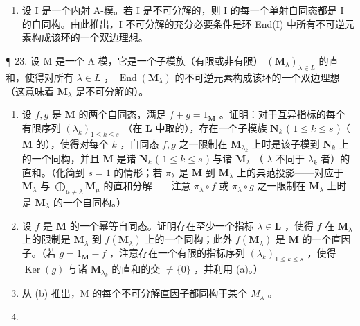 \begin{enumerate}
\def\labelenumi{\arabic{enumi}.}
\setcounter{enumi}{21}
\tightlist
\item
  设 I 是一个内射 A-模。若 I 是不可分解的，则 I 的每一个单射自同态都是 I 的自同构。由此推出，I 不可分解的充分必要条件是环 End(I) 中所有不可逆元素构成该环的一个双边理想。
\end{enumerate}

¶ 23. 设 M 是一个 A-模，它是一个子模族（有限或非有限） \((\mathbf{M}_{\lambda})_{\lambda \in L}\) 的直和，使得对所有 \(\lambda \in L\) ， \(\operatorname{End}(\mathbf{M}_{\lambda})\) 的不可逆元素构成该环的一个双边理想（这意味着 \(\mathbf{M}_{\lambda}\) 是不可分解的）。

\begin{enumerate}
\def\labelenumi{(\alph{enumi})}
\item
  设 \(f, g\) 是 \(\mathbf{M}\) 的两个自同态，满足 \(f + g = 1_{\mathbf{M}}\) 。证明：对于互异指标的每个有限序列 \((\lambda_k)_{1 \leqslant k \leqslant s}\) （在 \(\mathbf{L}\) 中取的），存在一个子模族 \(\mathbf{N}_k\) ( \(1 \leqslant k \leqslant s\) )（ \(\mathbf{M}\) 的），使得对每个 \(k\) ，自同态 \(f, g\) 之一限制在 \(\mathbf{M}_{\lambda_{k}}\) 上时是该子模到 \(\mathbf{N}_k\) 上的一个同构，并且 \(\mathbf{M}\) 是诸 \(\mathbf{N}_k\) ( \(1 \leqslant k \leqslant s\) ) 与诸 \(\mathbf{M}_{\lambda}\) （ \(\lambda\) 不同于 \(\lambda_k\) 者）的直和。（化简到 \(s = 1\) 的情形；若 \(\pi_{\lambda}\) 是 \(\mathbf{M}\) 到 \(\mathbf{M}_{\lambda}\) 上的典范投影——对应于 \(\mathbf{M}_{\lambda}\) 与 \(\bigoplus_{\mu \neq \lambda} \mathbf{M}_{\mu}\) 的直和分解——注意 \(\pi_{\lambda} \circ f\) 或 \(\pi_{\lambda} \circ g\) 之一限制在 \(\mathbf{M}_{\lambda}\) 上时是 \(\mathbf{M}_{\lambda}\) 的一个自同构。）
\item
  设 \(f\) 是 \(\mathbf{M}\) 的一个幂等自同态。证明存在至少一个指标 \(\lambda \in \mathbf{L}\) ，使得 \(f\) 在 \(\mathbf{M}_{\lambda}\) 上的限制是 \(\mathbf{M}_{\lambda}\) 到 \(f(\mathbf{M}_{\lambda})\) 上的一个同构；此外 \(f(\mathbf{M}_{\lambda})\) 是 \(\mathbf{M}\) 的一个直因子。（若 \(g = 1_{\mathbf{M}} - f\) ，注意存在一个有限的指标序列 \((\lambda_k)_{1 \leqslant k \leqslant s}\) ，使得 \(\operatorname{Ker}(g)\) 与诸 \(\mathbf{M}_{\lambda_k}\) 的直和的交 \(\neq \{0\}\) ，并利用 (a)。）
\item
  从 (b) 推出，M 的每个不可分解直因子都同构于某个 \(M_{\lambda}\) 。
\item

\end{enumerate}

